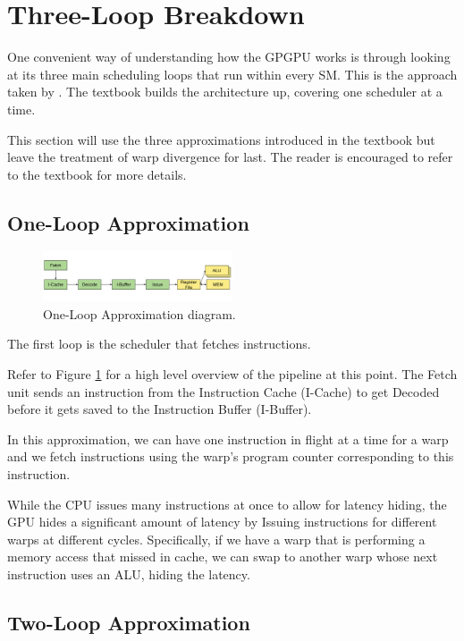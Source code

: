 \section{Three-Loop Breakdown}

One convenient way of understanding how the GPGPU works is through
looking at its three main scheduling loops that run within every SM.
This is the approach taken by \cite{aamodt2018general}.
The textbook builds the architecture up, covering one scheduler at a time.

This section will use the three approximations introduced in the textbook but
leave the treatment of warp divergence for last. The reader is encouraged to
refer to the textbook for more details.

\subsection{One-Loop Approximation}

\begin{figure}[h]
    \centering
    \includegraphics[width=0.5\textwidth]{assets/1.png}
    \caption{One-Loop Approximation diagram. }
    \label{fig:oneloop}
\end{figure}

The first loop is the scheduler that fetches instructions. 

Refer to Figure \ref{fig:oneloop} for a high level overview of the pipeline at this point.
The Fetch unit sends an instruction from the Instruction Cache (I-Cache) to
get Decoded before it gets saved to the Instruction Buffer (I-Buffer).

In this approximation, we can have one instruction in flight at a time for
a warp and we fetch instructions using the warp's program counter corresponding
to this instruction.

While the CPU issues many instructions at once to allow for latency
hiding, the GPU hides a significant amount of latency by Issuing
instructions for different warps at different cycles. Specifically, if we have
a warp that is performing a memory access that missed in cache, we can swap
to another warp whose next instruction uses an ALU, hiding the latency.

\subsection{Two-Loop Approximation}

